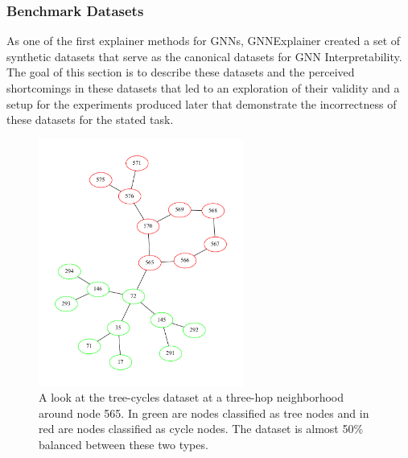 \subsubsection{Benchmark Datasets}
As one of the first explainer methods for GNNs, GNNExplainer created a set of synthetic datasets that serve as the canonical datasets for GNN Interpretability. The goal of this section is to describe these datasets and the perceived shortcomings in these datasets that led to an exploration of their validity and a setup for the experiments produced later that demonstrate the incorrectness of these datasets for the stated task.
\begin{figure}[h]
	\centering
	\includegraphics[width=0.6\textwidth]{images/tree-cycles.pdf}
	\caption{A look at the tree-cycles dataset at a three-hop neighborhood around node 565. In green are nodes classified as tree nodes and in red are nodes classified as cycle nodes. The dataset is almost 50\% balanced between these two types.}
	\label{fig:tree-cycles}
\end{figure}

